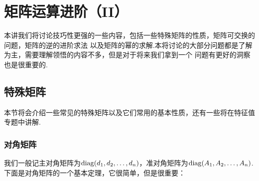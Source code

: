 \chapter{矩阵运算进阶（II）}

本讲我们将讨论技巧性更强的一些内容，包括一些特殊矩阵的性质，矩阵可交换的问题，矩阵的逆的进阶求法
以及矩阵的幂的求解.本将讨论的大部分问题都是了解为主，需要理解领悟的内容不多，但是对于将来我们拿到一个
问题有更好的洞察也是很重要的.

\section{特殊矩阵}
本节将会介绍一些常见的特殊矩阵以及它们常用的基本性质，还有一些将在特征值专题中讲解.
\subsection{对角矩阵}
我们一般记主对角矩阵为$\operatorname{diag}(d_1,d_2,\dots,d_n)$，准对角矩阵为$\operatorname{diag}(A_1,A_2,\dots,A_n)$.
下面是对角矩阵的一个基本定理，它很简单，但是很重要：
